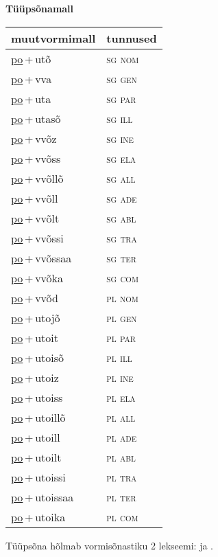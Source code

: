 
\vspace{1.8em}
\begin{minipage}{\textwidth}
\textbf{Tüüpsõnamall \,}\\

\begin{sideways}
\begin{tabular}{l l}
muutvormimall & tunnused \\
\hline
\underline{po}\,+\,utõ & \textsc{ sg nom } \\
\underline{po}\,+\,vva & \textsc{ sg gen } \\
\underline{po}\,+\,uta & \textsc{ sg par } \\
\underline{po}\,+\,utasõ & \textsc{ sg ill } \\
\underline{po}\,+\,vvõz & \textsc{ sg ine } \\
\underline{po}\,+\,vvõss & \textsc{ sg ela } \\
\underline{po}\,+\,vvõllõ & \textsc{ sg all } \\
\underline{po}\,+\,vvõll & \textsc{ sg ade } \\
\underline{po}\,+\,vvõlt & \textsc{ sg abl } \\
\underline{po}\,+\,vvõssi & \textsc{ sg tra } \\
\underline{po}\,+\,vvõssaa & \textsc{ sg ter } \\
\underline{po}\,+\,vvõka & \textsc{ sg com } \\
\underline{po}\,+\,vvõd & \textsc{ pl nom } \\
\underline{po}\,+\,utojõ & \textsc{ pl gen } \\
\underline{po}\,+\,utoit & \textsc{ pl par } \\
\underline{po}\,+\,utoisõ & \textsc{ pl ill } \\
\underline{po}\,+\,utoiz & \textsc{ pl ine } \\
\underline{po}\,+\,utoiss & \textsc{ pl ela } \\
\underline{po}\,+\,utoillõ & \textsc{ pl all } \\
\underline{po}\,+\,utoill & \textsc{ pl ade } \\
\underline{po}\,+\,utoilt & \textsc{ pl abl } \\
\underline{po}\,+\,utoissi & \textsc{ pl tra } \\
\underline{po}\,+\,utoissaa & \textsc{ pl ter } \\
\underline{po}\,+\,utoika & \textsc{ pl com } \\
\end{tabular}
\end{sideways}
\label{tab:tüüpsõnamall-poutõ}

\end{minipage}

 
\vspace{1em}
\noindent Tüüpsõna hõlmab vormisõnastiku 2 lekseemi:  ja .
